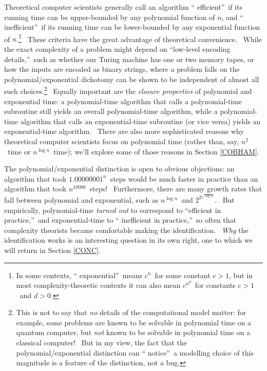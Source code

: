 \documentclass[12pt,onecolumn]{article}%
\begin{document}
Theoretical computer scientists generally call an algorithm \textquotedblleft
efficient\textquotedblright\ if its running time can be upper-bounded by any
polynomial function of $n$, and \textquotedblleft
inefficient\textquotedblright\ if its running time can be lower-bounded by any
exponential function of $n$.\footnote{In some contexts, \textquotedblleft
exponential\textquotedblright\ means $c^{n}$\ for some constant $c>1$, but in
most complexity-theoretic contexts it can also mean $c^{n^{d}}$\ for constants
$c>1$\ and $d>0$.} \ These criteria have the great advantage of theoretical
convenience. \ While the exact complexity of a problem might depend on
\textquotedblleft low-level encoding details,\textquotedblright\ such as
whether our Turing machine has one or two memory tapes, or how the inputs are
encoded as binary strings, where a problem falls on the polynomial/exponential
dichotomy can be shown to be independent of almost all such
choices.\footnote{This is not to say that \textit{no} details of the
computational model matter: for example, some problems are known to be
solvable in polynomial time on a quantum computer, but \textit{not} known to
be solvable in polynomial time on a classical computer! \ But in my view, the
fact that the polynomial/exponential distinction can \textquotedblleft
notice\textquotedblright\ a modelling choice of this magnitude is a feature of
the distinction, not a bug.} \ Equally important are the \textit{closure
properties} of polynomial and exponential time: a polynomial-time algorithm
that calls a polynomial-time subroutine still yields an overall
polynomial-time algorithm, while a polynomial-time algorithm that calls an
exponential-time subroutine (or vice versa) yields an exponential-time
algorithm. \ There are also more sophisticated reasons why theoretical
computer scientists focus on polynomial time (rather than, say, $n^{2}$\ time
or $n^{\log n}$\ time); we'll explore some of those reasons in Section
\ref{COBHAM}.

The polynomial/exponential distinction is open to obvious objections: an
algorithm that took $1.00000001^{n}$\ steps would be much faster in practice
than an algorithm that took $n^{10000}$\ steps! \ Furthermore, there are many
growth rates that fall between polynomial and exponential, such as $n^{\log
n}$\ and $2^{2^{\sqrt{\log n}}}$. \ But empirically, polynomial-time
\textit{turned out} to correspond to \textquotedblleft efficient in
practice,\textquotedblright\ and exponential-time to \textquotedblleft
inefficient in practice,\textquotedblright\ so often that complexity theorists
became comfortable making the identification. \ \textit{Why} the
identification works is an interesting question in its own right, one to which
we will return in Section \ref{CONC}.
\end{document}
